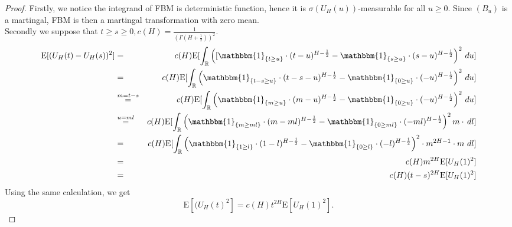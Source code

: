 \documentclass[a4paper, twoside, 11pt]{article}
\theoremstyle{definition}
\newcommand{\brkt}[1]{\left({#1} \right)}
\begin{document}
\begin{proof}
  Firstly, we notice the integrand of FBM is deterministic function, hence it is $\sigma(U_H(u))$-measurable for all $u\ge 0$. Since $(B_u)$ is a martingal, FBM is then a martingal transformation with zero mean. \\
  Secondly we suppose that $t \ge s \ge 0,  c(H)=\frac{1}{(\Gamma(H+\frac{1}{2}))^2}$.
  \begin{eqnarray}
	\mathrm{E}[(U_H(t) - U_H(s))^2] &=& c(H)\mathrm{E}[\int_{\mathbb{R}} \brkt{[\mathbbm{1}_{\{t\ge u\}}\cdot(t-u)^{H-\frac{1}{2}}  - \mathbbm{1}_{\{s\ge u\}}\cdot(s-u)^{H-\frac{1}{2}}}^2 \,\mathop{du}]\nonumber\\
	&=& c(H)\mathrm{E}[\int_{\mathbb{R}} \brkt{\mathbbm{1}_{\{t-s \ge u\}}\cdot(t-s-u)^{H-\frac{1}{2}}  - \mathbbm{1}_{\{0\ge u\}}\cdot(-u)^{H-\frac{1}{2}}}^2 \,\mathop{du}]\nonumber\\
	&\overset{m=t-s}{=}& c(H)\mathrm{E}[\int_{\mathbb{R}} \brkt{\mathbbm{1}_{\{m \ge u\}}\cdot(m-u)^{H-\frac{1}{2}}  - \mathbbm{1}_{\{0\ge u\}}\cdot(-u)^{H-\frac{1}{2}}}^2 \,\mathop{du}]\nonumber\\
	&\overset{u=ml}{=}& c(H)\mathrm{E}[\int_{\mathbb{R}} \brkt{\mathbbm{1}_{\{m \ge ml\}}\cdot(m-ml)^{H-\frac{1}{2}}  - \mathbbm{1}_{\{0\ge ml\}}\cdot(-ml)^{H-\frac{1}{2}}}^2 m\cdot\,\mathop{dl}]\nonumber\\
	&=& c(H)\mathrm{E}[\int_{\mathbb{R}} \brkt{\mathbbm{1}_{\{1 \ge l \}}\cdot(1-l)^{H-\frac{1}{2}}  - \mathbbm{1}_{\{0\ge l\}}\cdot(-l)^{H-\frac{1}{2}}}^2 \cdot m^{2H-1}\cdot m\,\mathop{dl}]\nonumber\\
	&=& c(H)m^{2H}\mathrm{E}[U_H(1)^2]\nonumber\\
	&=& c(H)(t-s)^{2H}\mathrm{E}[U_H(1)^2]
	\label{sec:eqn1}
  \end{eqnarray}
  Using the same calculation, we get
  \begin{equation}
	\mathrm{E}[(U_H(t)^2] = c(H)t^{2H}\mathrm{E}[U_H(1)^2].
	\label{sec:eqn2}
  \end{equation}


\end{proof}
\end{document}
